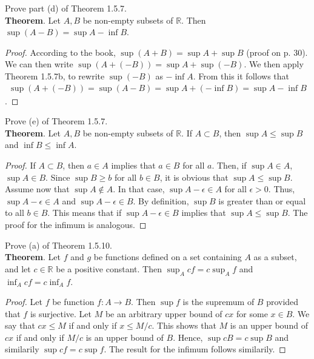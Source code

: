 \documentclass[12pt]{book}
\newenvironment{exercise}[2][Exercise]{\begin{trivlist}
\item[\hskip \labelsep {\bfseries #1}\hskip \labelsep {\bfseries #2.}]}{\end{trivlist}}
\begin{document}
\begin{exercise}{1.5.6}
Prove part (d) of Theorem 1.5.7.\\

\textbf{Theorem}. Let $A,B$ be non-empty subsets of $\mathbb{R}$. Then $\sup (A-B) = \sup A - \inf B$.

	\begin{proof}
	According to the book, $\sup(A+B) = \sup A + \sup B$ (proof on p. 30). We can then write $\sup (A + (-B) ) = \sup A + \sup(-B)$. We then apply Theorem 1.5.7b, to rewrite $\sup(-B)$ as $-\inf A$. From this it follows that 
	\begin{align*}
	\sup(A + (-B)) = \sup(A-B) = \sup A + (- \inf B) = \sup A - \inf B
	\end{align*}.
	\end{proof}
\end{exercise}




\begin{exercise}{1.5.7}
Prove (e) of Theorem 1.5.7. \\

\textbf{Theorem}. Let $A,B$ be non-empty subsets of $\mathbb{R}$. If $A \subset B$, then $\sup A \leq \sup B$ and $\inf B \leq \inf A$.
	\begin{proof}
	If $A \subset B$, then $a \in A$ implies that $a \in B$ for all $a$. Then, if $\sup A \in A$, $\sup A \in B$. Since $\sup B \geq b$ for all $b \in B$, it is obvious that $\sup A \leq \sup B$. Assume now that $\sup A \notin A$. In that case, $\sup A - \epsilon \in A$ for all $\epsilon > 0$. Thus, $\sup A - \epsilon \in A$ and $\sup A - \epsilon \in B$. By definition, $\sup B$ is greater than or equal to all $b \in B$. This means  that if $\sup A - \epsilon \in B$ implies that $\sup A \leq \sup B$. The proof for the infimum is analogous.
	\end{proof}
\end{exercise}

\begin{exercise}{1.5.10}
Prove (a) of Theorem 1.5.10. \\

\textbf{Theorem}. Let $f$ and $g$ be functions defined on a set containing $A$ as a subset, and let $c \in \mathbb{R}$ be a positive constant. Then $\sup_A c f= c \sup_A f$ and $\inf_A c f = c \inf_A f$.
	\begin{proof}
	Let $f$ be function $f: A \to B$. Then $\sup f$ is the supremum of $B$ provided that $f$ is surjective. Let $M$ be an arbitrary upper bound of $cx$ for some $x \in B$. We say that $c x \leq M$ if and only if $x \leq M/c$. This shows that $M$ is an upper bound of $c x$ if and only if $M/c$ is an upper bound of $B$. Hence, $\sup c B = c \sup B$ and similarily $\sup c f = c \sup f$. The result for the infimum follows similarily.
	\end{proof}
\end{exercise}
\end{document}
